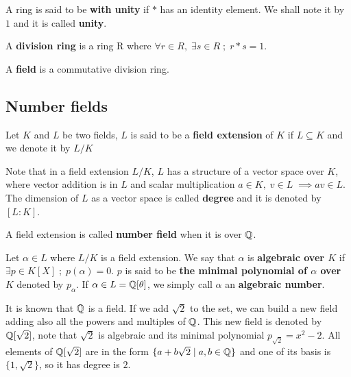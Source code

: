 \documentclass[a4paper,12pt]{article}
\begin{document}
\begin{definition}
  A ring is said to be \textbf{with unity} if $*$ has an identity element. We
  shall note it by $1$ and it is called \textbf{unity}.

\end{definition}

\begin{definition}
  A \textbf{division ring} is a ring R where $\forall r \in R, \; \exists s \in R \; ; \; r*s = 1$.
\end{definition}

\begin{definition}
  A \textbf{field} is a commutative division ring.
\end{definition}

\subsection{Number fields}
\label{sec:orgbf9148b}

   \begin{definition}
  Let $K$ and $L$ be two fields, $L$ is said to be a \textbf{field extension} of
  $K$ if $L \subseteq K$ and we denote it by $L/K$
\end{definition}

Note that in a field extension \(L/K\), \(L\) has a structure of a vector space over
\(K\), where vector addition is in \(L\) and scalar multiplication \(a \in K, \; v \in L
   \; \implies av \in L\). The dimension of \(L\) as a vector space is called
\textbf{degree} and it is denoted by \([L:K]\).

\begin{definition}
  A field extension is called \textbf{number field} when it is over $\mathbb{Q}$.
\end{definition}

\begin{definition}
  Let $\alpha \in L$ where $L/K$ is a field extension. We say that $\alpha$ is
  \textbf{algebraic over $K$} if $\exists p \in K[X] \;;\; p(\alpha) = 0$. $p$ is said to be
  \textbf{the minimal polynomial of $\alpha$ over $K$} denoted by $p_\alpha$. If $\alpha \in L =
  \mathbb{Q}[\theta]$, we simply call $\alpha$ an \textbf{algebraic number}.
\end{definition}

\begin{example}
  It is known that $\mathbb{Q}$ is a field. If we add $\sqrt{2}$ to the set, we
  can build a new field adding also all the powers and multiples of
  $\mathbb{Q}$. This new field is denoted by $\mathbb{Q}[\sqrt{2}]$, note that
  $\sqrt{2}$ is algebraic and its minimal polynomial $p_{\sqrt{2}} = x^2-2$. All
  elements of $\mathbb{Q}[\sqrt{2}]$ are in the form $\{a+b\sqrt{2} \;|\; a,b \in
  \mathbb{Q}\}$ and one of its basis is $\{1, \sqrt{2}\}$, so it has degree is
  $2$.
\end{example}
\end{document}
